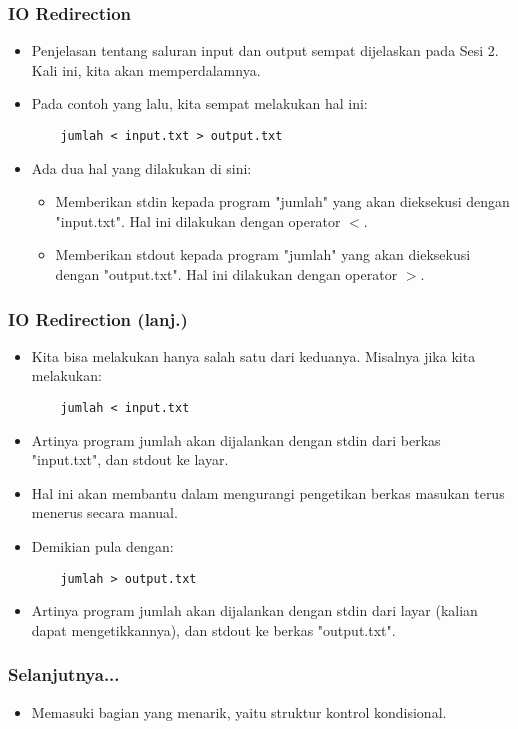 \documentclass{beamer}
\begin{document}
\begin{frame}[fragile]
\frametitle{IO Redirection}
\begin{itemize}
	\item Penjelasan tentang saluran input dan output sempat dijelaskan pada Sesi 2. Kali ini, kita akan memperdalamnya.
	\item Pada contoh yang lalu, kita sempat melakukan hal ini:
	\begin{lstlisting}
	jumlah < input.txt > output.txt
	\end{lstlisting}
	\item Ada dua hal yang dilakukan di sini:
	\begin{itemize}
		\item Memberikan stdin kepada program "jumlah" yang akan dieksekusi dengan "input.txt". Hal ini dilakukan dengan operator $<$.
		\item Memberikan stdout kepada program "jumlah" yang akan dieksekusi dengan "output.txt". Hal ini dilakukan dengan operator $>$.
	\end{itemize}
\end{itemize}
\end{frame}

\begin{frame}[fragile]
\frametitle{IO Redirection (lanj.)}
\begin{itemize}
	\item Kita bisa melakukan hanya salah satu dari keduanya. Misalnya jika kita melakukan:
	\begin{lstlisting}
	jumlah < input.txt
	\end{lstlisting}
	\item Artinya program jumlah akan dijalankan dengan stdin dari berkas "input.txt", dan stdout ke layar.
	\item Hal ini akan membantu dalam mengurangi pengetikan berkas masukan terus menerus secara manual.
	\item Demikian pula dengan:
	\begin{lstlisting}
	jumlah > output.txt
	\end{lstlisting}
	\item Artinya program jumlah akan dijalankan dengan stdin dari layar (kalian dapat mengetikkannya), dan stdout ke berkas "output.txt".
	\end{itemize}
\end{frame}

\begin{frame}
\frametitle{Selanjutnya...}
\begin{itemize}
	\item Memasuki bagian yang menarik, yaitu struktur kontrol kondisional.
\end{itemize}
\end{frame}
\end{document}

